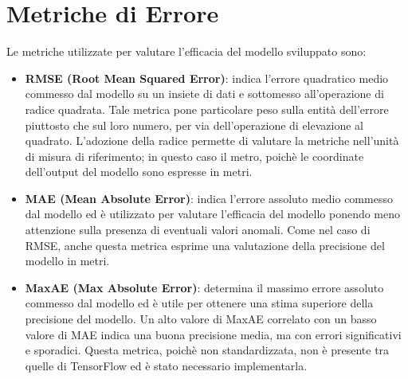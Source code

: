 
\chapter{Metriche di Errore}\label{app:metrics}
Le metriche utilizzate per valutare l'efficacia del modello sviluppato sono:
\begin{itemize}
  \item \textbf{ RMSE (Root Mean Squared Error)}: indica l'errore quadratico medio
    commesso dal modello su un insiete di dati e sottomesso all'operazione di
    radice quadrata. Tale metrica pone particolare peso sulla entità
    dell'errore piuttosto che sul loro numero, per via dell'operazione di
    elevazione al quadrato. L'adozione della radice permette di valutare la
    metriche nell'unità di misura di riferimento; in questo caso il metro,
    poichè le coordinate dell'output del modello sono espresse in metri. 
  \item \textbf{MAE (Mean Absolute Error)}: indica l'errore assoluto medio commesso dal
    modello ed è utilizzato per valutare l'efficacia del modello ponendo meno
    attenzione sulla presenza di eventuali valori anomali. Come nel caso di
    RMSE, anche questa metrica esprime una valutazione della precisione del
    modello in metri.
  \item \textbf{MaxAE (Max Absolute Error)}: determina il massimo errore assoluto
    commesso dal modello ed è utile per ottenere una stima superiore
    della precisione del modello. Un alto valore di MaxAE correlato con un
    basso valore di MAE indica una buona precisione media, ma con errori
    significativi e sporadici. Questa metrica, poichè non standardizzata, non è
    presente tra quelle di TensorFlow ed è stato necessario implementarla.
\end{itemize}


